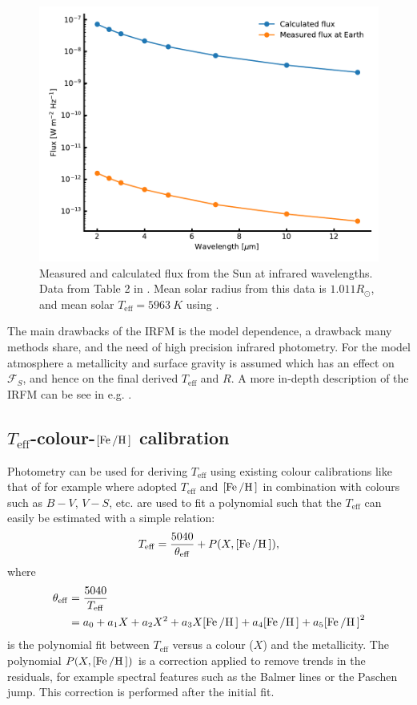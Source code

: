 \begin{figure}[htpb!]
    \centering
    \includegraphics[width=0.85\linewidth]{figures/IRFM.pdf}
    \caption{Measured and calculated flux from the Sun at infrared wavelengths. Data from Table 2 in
             \citet{Blackwell1977}. Mean solar radius from this data is $1.011R_\odot$, and mean
             solar $T_\mathrm{eff}=\SI{5963}{K}$ using .}
    \label{fig:IRFM}
\end{figure}

The main drawbacks of the IRFM is the model dependence, a drawback many methods share, and the need
of high precision infrared photometry. For the model atmosphere a metallicity and surface gravity is
assumed which has an effect on $\mathcal{F}_S$, and hence on the final derived $T_\mathrm{eff}$ and
$R$. A more in-depth description of the IRFM can be see in e.g. \citet[][section 4]{Casagrande2006}.


\subsection{$T_\mathrm{eff}$-colour-$[\ion{Fe}/\ion{H}]$ calibration}

Photometry can be used for deriving $T_\mathrm{eff}$ using existing colour calibrations like that of
for example \citet{Ramirez2005a} where adopted $T_\mathrm{eff}$ and $[\ion{Fe}/\ion{H}]$ in
combination with colours such as $B-V$, $V-S$, etc. are used to fit a polynomial such that the
$T_\mathrm{eff}$ can easily be estimated with a simple relation:
\begin{align}
  T_\mathrm{eff} = \frac{5040}{\theta_\mathrm{eff}} + P(X, [\ion{Fe}/\ion{H}]),
\end{align}
where
\begin{align}
  \theta_\mathrm{eff} &= \frac{5040}{T_\mathrm{eff}} \\
                      &= a_0+a_1 X+a_2 X^2+a_3X[\ion{Fe}/\ion{H}] + a_4[\ion{Fe}/\ion{H}] + a_5[\ion{Fe}/\ion{H}]^2
\end{align}
is the polynomial fit between $T_\mathrm{eff}$ versus a colour ($X$) and the metallicity. The
polynomial $P(X, [\ion{Fe}/\ion{H}])$ is a correction applied to remove trends in the residuals, for
example spectral features such as the Balmer lines or the Paschen jump. This correction is performed
after the initial fit.


